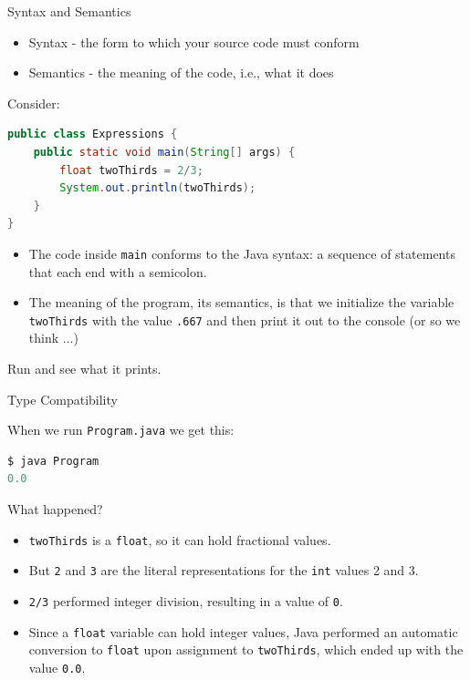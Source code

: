 \documentclass{beamer}
\begin{document}
\begin{frame}[fragile]{Syntax and Semantics}


\begin{itemize}
\item Syntax - the form to which your source code must conform
\item Semantics - the meaning of the code, i.e., what it does
\end{itemize}
Consider:
\begin{lstlisting}[language=Java]
public class Expressions {
    public static void main(String[] args) {
        float twoThirds = 2/3;
        System.out.println(twoThirds);
    }
}
\end{lstlisting}

\begin{itemize}
\item The code inside {\tt main} conforms to the Java syntax: a sequence of statements that each end with a semicolon.
\item The meaning of the program, its semantics, is that we initialize the variable {\tt twoThirds} with the value {\tt .667} and then print it out to the console (or so we think ...)
\end{itemize}

Run  and see what it prints.

\end{frame}

\begin{frame}[fragile]{Type Compatibility}


When we run {\tt Program.java} we get this:
\begin{lstlisting}[language=Java]
$ java Program
0.0
\end{lstlisting}
What happened?
\begin{itemize}
\item {\tt twoThirds} is a {\tt float}, so it can hold fractional values.
\item But {\tt 2} and {\tt 3} are the literal representations for the {\tt int} values 2 and 3.
\item {\tt 2/3} performed integer division, resulting in a value of {\tt 0}.
\item Since a {\tt float} variable can hold integer values, Java performed an automatic conversion to {\tt float} upon assignment to {\tt twoThirds}, which ended up with the value {\tt 0.0}.
\end{itemize}


\end{frame}
\end{document}
